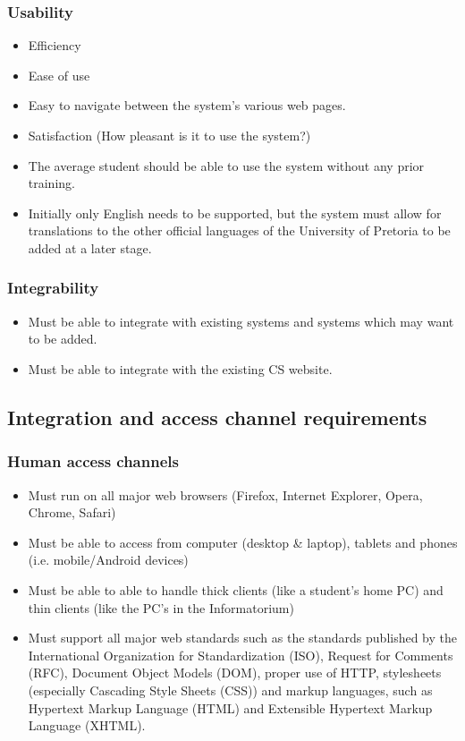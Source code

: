 \documentclass[12pt, oneside]{article}
\begin{document}
		\subsubsection{Usability}
			\begin{itemize}
				\item Efficiency
				\item Ease of use
				\item Easy to navigate between the system's various web pages.
				\item Satisfaction (How pleasant is it to use the system?)
				\item The average student should be able to use the system without any prior training.
				\item Initially only English needs to be supported, but the system must allow for translations to the other official languages of the University of Pretoria to be added at a later stage.
			\end{itemize}
		\subsubsection{Integrability}
				\begin{itemize}
					\item Must be able to integrate with existing systems and systems which may want to be added.
					\item Must be able to integrate with the existing CS website.
				\end{itemize}
				
	\subsection{Integration and access channel requirements}
				\subsubsection{Human access channels}
				\begin{itemize}
					\item Must run on all major web browsers (Firefox, Internet Explorer, Opera, Chrome, Safari)
					\item Must be able to access from computer (desktop \& laptop), tablets and phones (i.e. mobile/Android devices)
					\item Must be able to able to handle thick clients (like a student's home PC) and thin clients (like the PC's in the Informatorium)
					\item Must support all major web standards such as the standards published by the International Organization for Standardization (ISO), Request for Comments (RFC), Document Object Models (DOM), proper use of HTTP, stylesheets (especially Cascading Style Sheets (CSS)) and markup languages, such as Hypertext Markup Language (HTML) and Extensible Hypertext Markup Language (XHTML).
				\end{itemize}
\end{document}
